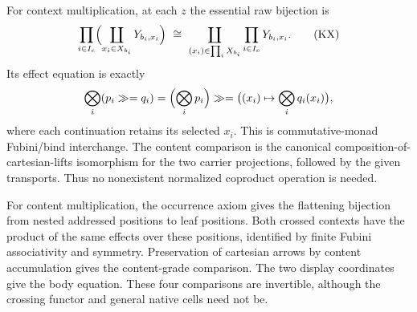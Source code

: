 \documentclass[11pt]{article}
\begin{document}
For context multiplication, at each $z$ the essential raw bijection is
\[
 \prod_{i\in I_c}\Bigl(\coprod_{x_i\in X_{b_i}}Y_{b_i,x_i}\Bigr)
 \ \cong\
 \coprod_{(x_i)\in\prod_iX_{b_i}}\prod_{i\in I_c}Y_{b_i,x_i}.\tag{KX}
\]
Its effect equation is exactly
\[
 \bigotimes_i(p_i\gg=q_i)
 =\Bigl(\bigotimes_i p_i\Bigr)\gg=
       \bigl((x_i)\mapsto\bigotimes_i q_i(x_i)\bigr),
\]
where each continuation retains its selected $x_i$. This is commutative-monad Fubini/bind interchange. The content comparison is the canonical composition-of-cartesian-lifts isomorphism for the two carrier projections, followed by the given transports. Thus no nonexistent normalized coproduct operation is needed.

For content multiplication, the occurrence axiom gives the flattening bijection from nested addressed positions to leaf positions. Both crossed contexts have the product of the same effects over these positions, identified by finite Fubini associativity and symmetry. Preservation of cartesian arrows by content accumulation gives the content-grade comparison. The two display coordinates give the body equation. These four comparisons are invertible, although the crossing functor and general native cells need not be.
\end{document}
